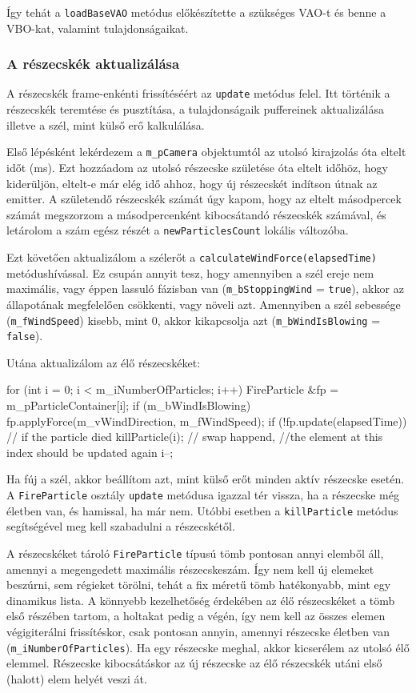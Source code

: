 Így tehát a \texttt{loadBaseVAO} metódus előkészítette a szükséges VAO-t és benne a VBO-kat, valamint tulajdonságaikat.

\subsubsection{A részecskék aktualizálása}
A részecskék frame-enkénti frissítéséért az \texttt{update} metódus felel. Itt történik a részecskék teremtése és pusztítása, a tulajdonságaik puffereinek aktualizálása illetve a szél, mint külső erő kalkulálása.

Első lépésként lekérdezem a \texttt{m\_pCamera} objektumtól az utolsó kirajzolás óta eltelt időt (ms). Ezt hozzáadom az utolsó részecske születése óta eltelt időhöz, hogy kiderüljön, eltelt-e már elég idő ahhoz, hogy új részecskét indítson útnak az emitter. A születendő részecskék számát úgy kapom, hogy az eltelt másodpercek számát megszorzom a másodpercenként kibocsátandó részecskék számával, és letárolom a szám egész részét a \texttt{newParticlesCount} lokális változóba.

Ezt követően aktualizálom a szélerőt a \texttt{calculateWindForce(elapsedTime)} metódushívással. Ez csupán annyit tesz, hogy amennyiben a szél ereje nem maximális, vagy éppen lassuló fázisban van (\texttt{m\_bStoppingWind} = \texttt{true}), akkor az állapotának megfelelően csökkenti, vagy növeli azt. Amennyiben a szél sebessége (\texttt{m\_fWindSpeed}) kisebb, mint $0$, akkor kikapcsolja azt (\texttt{m\_bWindIsBlowing} = \texttt{false}).

Utána aktualizálom az élő részecskéket:
\begin{cpp}
for (int i = 0; i < m_iNumberOfParticles; i++)
{
	FireParticle &fp = m_pParticleContainer[i];
	if (m_bWindIsBlowing) {
		fp.applyForce(m_vWindDirection, m_fWindSpeed);
	}
	if (!fp.update(elapsedTime)) {
		// if the particle died
		killParticle(i);
		// swap happend, 
		//the element at this index should be updated again
		i--;
	}
}
\end{cpp}
Ha fúj a szél, akkor beállítom azt, mint külső erőt minden aktív részecske esetén. A \texttt{FireParticle} osztály \texttt{update} metódusa igazzal tér vissza, ha a részecske még életben van, és hamissal, ha már nem. Utóbbi esetben a \texttt{killParticle} metódus segítségével meg kell szabadulni a részecskétől. 

A részecskéket tároló \texttt{FireParticle} típusú tömb pontosan annyi elemből áll, amennyi a megengedett maximális részecskeszám. Így nem kell új elemeket beszúrni, sem régieket törölni, tehát a fix méretű tömb hatékonyabb, mint egy dinamikus lista. A könnyebb kezelhetőség érdekében az élő részecskéket a tömb első részében tartom, a holtakat pedig a végén, így nem kell az összes elemen végigiterálni frissítéskor, csak pontosan annyin, amennyi részecske életben van (\texttt{m\_iNumberOfParticles}). Ha egy részecske meghal, akkor kicserélem az utolsó élő elemmel. Részecske kibocsátáskor az új részecske az élő részecskék utáni első (halott) elem helyét veszi át. 

